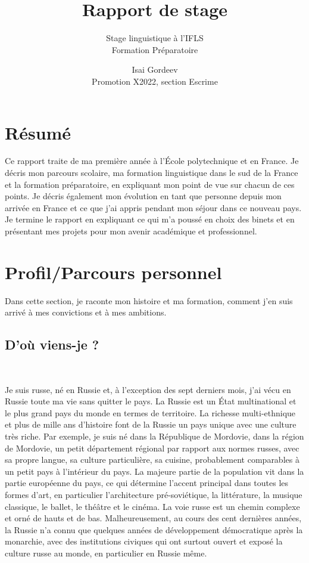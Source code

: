 \documentclass[a4paper,12pt]{article}
\title{Rapport de stage}
\subtitle{Stage linguistique à l'IFLS \\
Formation Préparatoire}
\author{Isai Gordeev\\
Promotion X2022, section Escrime}
\begin{document}
\maketitle

\section*{Résumé}

Ce rapport traite de ma première année à l'École polytechnique et en France. Je décris mon parcours scolaire, ma formation linguistique dans le sud de la France et la formation préparatoire, en expliquant mon point de vue sur chacun de ces points. Je décris également mon évolution en tant que personne depuis mon arrivée en France et ce que j'ai appris pendant mon séjour dans ce nouveau pays. Je termine le rapport en expliquant ce qui m'a poussé en choix des binets et en présentant mes projets pour mon avenir académique et professionnel.

\newpage


\tableofcontents



\section{Profil/Parcours personnel}

Dans cette section, je raconte mon histoire et ma formation, comment j'en suis arrivé à mes convictions et à mes ambitions.

\subsection{D’où viens-je ?} \

Je suis russe, né en Russie et, à l'exception des sept derniers mois, j'ai vécu en Russie toute ma vie sans quitter le pays. La Russie est un État multinational et le plus grand pays du monde en termes de territoire. La richesse multi-ethnique et plus de mille ans d'histoire font de la Russie un pays unique avec une culture très riche. Par exemple, je suis né dans la République de Mordovie, dans la région de Mordovie, un petit département régional par rapport aux normes russes, avec sa propre langue, sa culture particulière, sa cuisine, probablement comparables à un petit pays à l'intérieur du pays.
La majeure partie de la population vit dans la partie européenne du pays, ce qui détermine l'accent principal dans toutes les formes d'art, en particulier l'architecture pré-soviétique, la littérature, la musique classique, le ballet, le théâtre et le cinéma. La voie russe est un chemin complexe et orné de hauts et de bas. Malheureusement, au cours des cent dernières années, la Russie n'a connu que quelques années de développement démocratique après la monarchie, avec des institutions civiques qui ont surtout ouvert et exposé la culture russe au monde, en particulier en Russie même.
\end{document}
